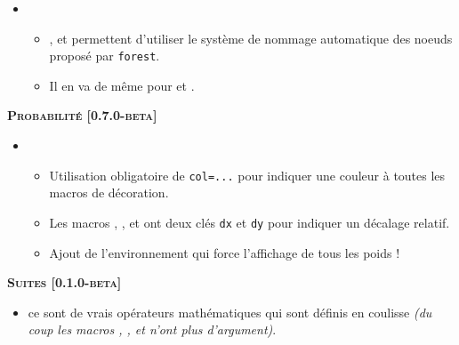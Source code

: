 \documentclass[12pt,a4paper]{book}
\begin{document}
\begin{description}
\begin{itemize}[itemsep=.5em]
    \item {}
    \begin{itemize}[itemsep=.5em]
        \item {},  et  permettent d'utiliser le système de nommage automatique des noeuds proposé par \verb#forest#.
        
        \item Il en va de même pour  et .
    \end{itemize}
\end{itemize}


\begin{center}
    \textbf{\textsc{Probabilité [0.7.0-beta]}}
\end{center}

\begin{itemize}[itemsep=.5em]
    \item {}
    \begin{itemize}[itemsep=.5em]
        \item Utilisation obligatoire de \verb#col=...# pour indiquer une couleur à toutes les macros de décoration.
        
        \item Les macros , , 
               et 
              ont deux clés \verb#dx# et \verb#dy# pour indiquer un décalage relatif.
        
        \item Ajout de l'environnement  qui force l'affichage de tous les poids !
    \end{itemize}
\end{itemize}


\separation




\begin{center}
    \textbf{\textsc{Suites [0.1.0-beta]}}
\end{center}

\begin{itemize}[itemsep=.5em]
    \item {}
          ce sont de vrais opérateurs mathématiques qui sont définis en coulisse \emph{(du coup les macros , ,  et  n'ont plus d'argument)}.   
\end{itemize}



\end{description}
\end{document}
